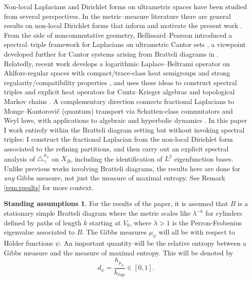 \documentclass[12pt]{amsart}
\theoremstyle{plain}
\theoremstyle{definition}
\newtheorem*{SA}{Standing assumptions}
\begin{document}
Non-local Laplacians and Dirichlet forms on ultrametric spaces have been studied from several perspectives. In the metric–measure literature there are general results on non‑local Dirichlet forms that inform and motivate the present work \cite{KK:wavelets, Bendikov:ultra, BGHH:HK}. From the side of noncommutative geometry, Bellissard–Pearson introduced a spectral–triple framework for Laplacians on ultrametric Cantor sets \cite{BP:ultra}, a viewpoint developed further for Cantor systems arising from Bratteli diagrams in \cite{JS:LaplacianTiling, HKL:DirGraph}. Relatedly, recent work develops a logarithmic Laplace–Beltrami operator on Ahlfors‑regular spaces with compact/trace‑class heat semigroups and strong regularity/compatibility properties \cite{GM:logLap}, and uses these ideas to construct spectral triples and explicit heat operators for Cuntz–Krieger algebras and topological Markov chains \cite{GGM:HeatCuntz}. A complementary direction connects fractional Laplacians to Monge–Kantorovič (quantum) transport via Schatten‑class commutators and Weyl laws, with applications to algebraic and hyperbolic dynamics \cite{GM:QuantumMetrics}. In this paper I work entirely within the Bratteli diagram setting but without invoking spectral triples: I construct the fractional Laplacian from the non‑local Dirichlet form associated to the refining partitions, and then carry out an explicit spectral analysis of $\triangle_\gamma^{\mu_\psi}$ on $X_B$, including the identification of $L^2$ eigenfunction bases. Unlike previous works involving Bratteli diagrams, the results here are done for \emph{any} Gibbs measure, not just the measure of maximal entropy. See Remark \ref{rem:results} for more context.

\begin{SA}
    For the results of the paper, it is assumed that $B$ is a stationary simple Bratteli diagram where the metric scales like $\lambda^{-k}$ for cylinders defined by paths of length $k$ starting at $V_0$, where $\lambda>1$ is the Perron-Frobenius eigenvalue associated to $B$. The Gibbs measures $\mu_\psi$ will all be with respect to H\"older functions $\psi$. An important quantity will be the relative entropy between a Gibbs measure and the measure of maximal entropy. This will be denoted by
    $$d_\psi = \frac{h_{\mu_\psi}}{h_{top}}\in[0,1].$$
\end{SA}
\end{document}
